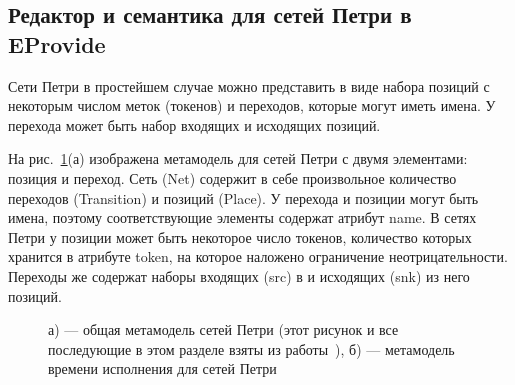 \documentclass[a5paper]{article}
\begin{document}
\subsection{Редактор и семантика для сетей Петри в EProvide}

Сети Петри в простейшем случае можно представить в виде набора позиций с некоторым числом меток (токенов) и переходов, которые могут иметь имена. У перехода может быть набор входящих и исходящих позиций.

На рис.~\ref{fig9}(а) изображена метамодель для сетей Петри с двумя элементами: позиция и переход. Сеть (Net) содержит в себе произвольное количество переходов (Transition) и позиций (Place). У перехода и позиции могут быть имена, поэтому соответствующие элементы содержат атрибут name. В сетях Петри у позиции может быть некоторое число токенов, количество которых хранится в атрибуте token, на которое наложено ограничение неотрицательности. Переходы же содержат наборы входящих (src) в и исходящих (snk) из него позиций.

\begin{figure}[h]
\begin{center}
\begin{minipage}[h]{0.8\linewidth}
\end{minipage}
\begin{minipage}[h]{0.8\linewidth}
\end{minipage}
\end{center}
\caption{а) --- общая метамодель сетей Петри (этот рисунок и все последующие в этом разделе взяты из работы~\cite{wachsmuth1}), б) — метамодель времени исполнения для сетей Петри}
\label{fig9}
\end{figure}
\end{document}
